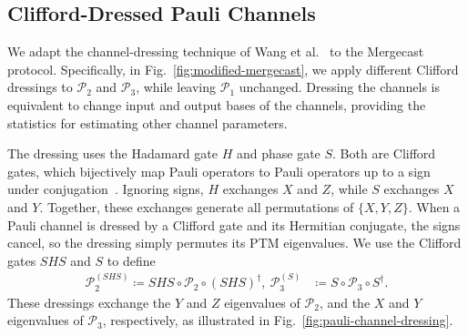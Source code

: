 \subsection{Clifford-Dressed Pauli Channels}
\label{subsec:Clifford-dressing}

We adapt the channel-dressing technique of Wang et al.~\cite{wang2025quantumnetworktomographygeneral} to the
Mergecast protocol.
Specifically, in Fig.~\ref{fig:modified-mergecast},
we apply different Clifford
dressings to \(\mathcal P_2\) and \(\mathcal P_3\), while leaving
\(\mathcal P_1\) unchanged.
Dressing the channels is equivalent to change
    input and output bases of the channels, providing the statistics for estimating other channel parameters.



The dressing uses the Hadamard gate \(H\) and phase gate \(S\).
Both are Clifford gates, which bijectively map Pauli operators to Pauli
operators up to a sign under
conjugation~\cite{Gottesman1998Heisenberg}.
Ignoring signs, \(H\) exchanges \(X\) and \(Z\), while \(S\)
exchanges \(X\) and \(Y\). Together, these exchanges generate all
permutations of \(\{X,Y,Z\}\).
When a Pauli channel is dressed by a Clifford gate and its Hermitian conjugate,
the signs cancel, so the dressing simply permutes its PTM
eigenvalues. We use the Clifford gates \(SHS\) and \(S\) to define
\begin{equation}
\begin{aligned}
\mathcal P_2^{(SHS)}
\coloneqq SHS\circ\mathcal P_2\circ(SHS)^\dagger,\
\mathcal P_3^{(S)}
&\coloneqq S\circ\mathcal P_3\circ S^\dagger.
\end{aligned}
\label{eq:dressed-pauli-channels}
\end{equation}
These dressings exchange the \(Y\) and \(Z\) eigenvalues of
\(\mathcal P_2\), and the \(X\) and \(Y\) eigenvalues of
\(\mathcal P_3\), respectively, as illustrated in
Fig.~\ref{fig:pauli-channel-dressing}.

